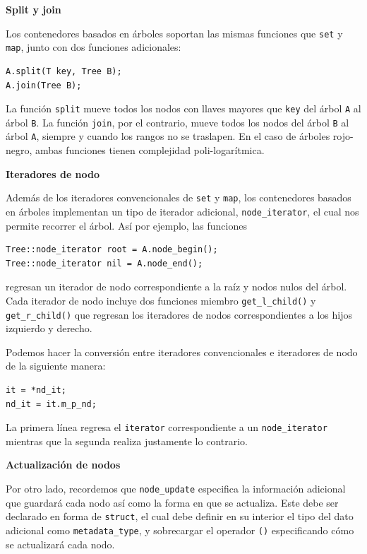 \documentclass[12pt, letterpaper, twoside]{article}
\begin{document}
\textbf{Split y join}

Los contenedores basados en árboles soportan las mismas funciones que \texttt{set} y \texttt{map}, junto con dos funciones adicionales: 

\begin{lstlisting}
A.split(T key, Tree B);
A.join(Tree B);
\end{lstlisting}

La función \texttt{split} mueve todos los nodos con llaves mayores que \texttt{key} del árbol \texttt{A} al árbol \texttt{B}. La función \texttt{join}, por el contrario, mueve todos los nodos del árbol \texttt{B} al árbol \texttt{A}, siempre y cuando los rangos no se traslapen. En el caso de árboles rojo-negro, ambas funciones tienen complejidad poli-logarítmica.\medskip

\textbf{Iteradores de nodo}

Además de los iteradores convencionales de \texttt{set} y \texttt{map}, los contenedores basados en árboles implementan un tipo de iterador adicional, \texttt{node\_iterator}, el cual nos permite recorrer el árbol. Así por ejemplo, las funciones
\begin{lstlisting}
Tree::node_iterator root = A.node_begin();
Tree::node_iterator nil = A.node_end();
\end{lstlisting}
regresan un iterador de nodo correspondiente a la raíz y nodos nulos del árbol. Cada iterador de nodo incluye dos funciones miembro \texttt{get\_l\_child()} y \texttt{get\_r\_child()} que regresan los iteradores de nodos correspondientes a los hijos izquierdo y derecho.

Podemos hacer la conversión entre iteradores convencionales e iteradores de nodo de la siguiente manera:
\begin{lstlisting}
it = *nd_it;
nd_it = it.m_p_nd;
\end{lstlisting}
La primera línea regresa el \texttt{iterator} correspondiente a un \texttt{node\_iterator} mientras que la segunda realiza justamente lo contrario.\medskip

\textbf{Actualización de nodos}

Por otro lado, recordemos que \texttt{node\_update} especifica la información adicional que guardará cada nodo así como la forma en que se actualiza. Este debe ser declarado en forma de \texttt{struct}, el cual debe definir en su interior el tipo del dato adicional como \texttt{metadata\_type}, y sobrecargar el operador \texttt{()} especificando cómo se actualizará cada nodo. 
\end{document}
